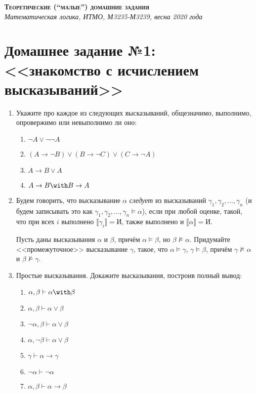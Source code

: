 \documentclass[10pt,a4paper,oneside]{article}
\begin{document}
\begin{center}{\Large\textsc{\textbf{Теоретические (``малые'') домашние задания}}}\\
             \it Математическая логика, ИТМО, М3235-М3239, весна 2020 года\end{center}

\section*{Домашнее задание №1: <<знакомство с исчислением высказываний>>}

\begin{enumerate}

\item Укажите про каждое из следующих высказываний, общезначимо, выполнимо, опровержимо или невыполнимо ли оно:
\begin{enumerate}
\item $\neg A\vee\neg\neg A$
\item $(A\rightarrow\neg B)\vee(B\rightarrow\neg C)\vee(C\rightarrow\neg A)$
\item $A \rightarrow B \vee A$
\item $A \rightarrow B \with B \rightarrow A$
\end{enumerate}

\item Будем говорить, что высказывание $\alpha$ \emph{следует} из высказываний $\gamma_1, \gamma_2, \dots, \gamma_n$
(и будем записывать это как $\gamma_1, \gamma_2, \dots, \gamma_n \models \alpha$), если
при любой оценке, такой, что при всех $i$ выполнено $\llbracket\gamma_i\rrbracket = \text{И}$,
также выполнено и $\llbracket\alpha\rrbracket = \text{И}$.

Пусть даны высказывания $\alpha$ и $\beta$, причём $\alpha\models\beta$, но $\beta\not\models\alpha$. 
Придумайте <<промежуточное>> высказывание $\gamma$, такое, что $\alpha \models \gamma$,
$\gamma \models \beta$, причём $\gamma\not\models\alpha$ и $\beta\not\models\gamma$.

\item Простые высказывания. Докажите высказывания, построив полный вывод:
\begin{enumerate}
\item $\alpha,\beta \vdash \alpha\with\beta$
\item $\alpha,\beta \vdash \alpha\vee\beta$
\item $\neg\alpha,\beta \vdash \alpha\vee\beta$
\item $\alpha,\neg\beta \vdash \alpha\vee\beta$
\item $\gamma \vdash \alpha\to\gamma$
\item $\neg\alpha \vdash \neg\alpha$
\item $\alpha,\beta \vdash \alpha\rightarrow\beta$
\end{enumerate}


\end{enumerate}
\end{document}
